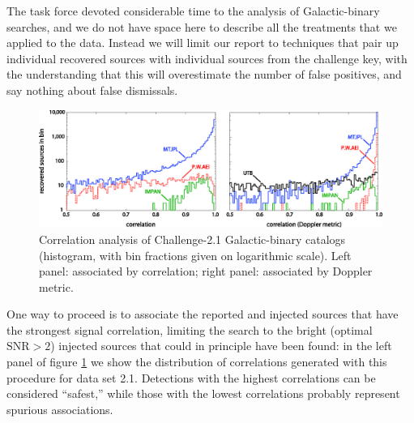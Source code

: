 \documentclass{iopart}
\begin{document}
The task force devoted considerable time to the analysis of Galactic-binary searches, and we do not have space here to describe all the treatments that we applied to the data. Instead we will limit our report to techniques that pair up individual recovered sources with individual sources from the challenge key, with the understanding that this will overestimate the number of false positives, and say nothing about false dismissals.
%
\begin{figure}
\includegraphics[width=\textwidth]{Correlations-2}
\vspace{-18pt}
\caption{Correlation analysis of Challenge-2.1 Galactic-binary catalogs (histogram, with bin fractions given on logarithmic scale).  Left panel: associated by correlation; right panel: associated by Doppler metric.\label{fig:correlation}}
\vspace{-6pt}
\end{figure}

One way to proceed is to associate the reported and injected sources that have the strongest signal correlation, limiting the search to the bright (optimal $\mathrm{SNR} > 2$) injected sources that could in principle have been found: in the left panel of figure \ref{fig:correlation} we show the distribution of correlations generated with this procedure for data set 2.1.
Detections with the highest correlations can be considered ``safest,'' while those with the lowest correlations probably represent spurious associations.
\end{document}
